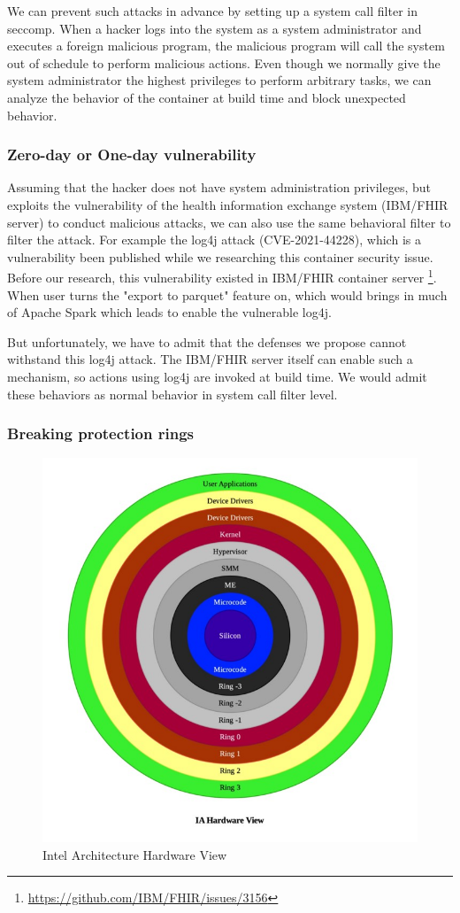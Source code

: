 We can prevent such attacks in advance by setting up a system call filter
in seccomp. When a hacker logs into the system as a system administrator
and executes a foreign malicious program, the malicious program will call
the system out of schedule to perform malicious actions.
Even though we normally give the system administrator the highest privileges
to perform arbitrary tasks, we can analyze the behavior of the container
at build time and block unexpected behavior.

\subsubsection{Zero-day or One-day vulnerability}
Assuming that the hacker does not have system administration privileges,
but exploits the vulnerability of the health information exchange system
(IBM/FHIR server) to conduct malicious attacks, we can also use the same
behavioral filter to filter the attack.
For example the log4j attack (CVE-2021-44228), which is a vulnerability
been published while we researching this container security issue.
Before our research, this vulnerability existed in IBM/FHIR container server
\footnote{\url{https://github.com/IBM/FHIR/issues/3156}}.
When user turns the "export to parquet" feature on, which would
brings in much of Apache Spark which leads to enable the vulnerable log4j.

But unfortunately, we have to admit that the defenses we propose cannot
withstand this log4j attack. The IBM/FHIR server itself can enable such a mechanism,
so actions using log4j are invoked at build time. We would admit these
behaviors as normal behavior in system call filter level.

\subsubsection{Breaking protection rings}

\begin{figure}
    \centering
    \includegraphics[width=.5\textwidth]{src/ring.jpeg}
    \caption{Intel Architecture Hardware View}
    \label{ring}
\end{figure}

